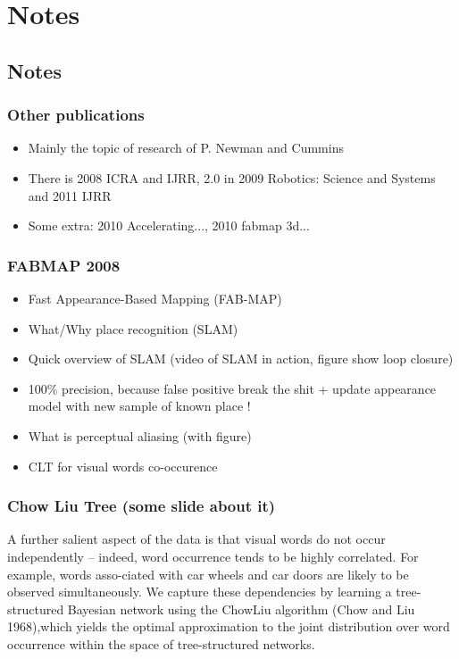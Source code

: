 \section{Notes}

\subsection{Notes}

\begin{frame}
    \frametitle{Other publications}
    \begin{itemize}
        \item Mainly the topic of research of P. Newman and Cummins
        \item There is 2008 ICRA and IJRR, 2.0 in 2009 Robotics: Science and Systems and 2011 IJRR
        \item Some extra: 2010 Accelerating..., 2010 fabmap 3d...
    \end{itemize}
\end{frame}

\begin{frame}
    \frametitle{FABMAP 2008}
    \begin{itemize}
        \item Fast Appearance-Based Mapping (FAB-MAP)
        \item What/Why place recognition (SLAM)
        \item Quick overview of SLAM (video of SLAM in action, figure show loop closure)
        \item 100\% precision, because false positive break the shit + update appearance model with new sample of known place !
        \item What is perceptual aliasing (with figure)
        \item CLT for visual words co-occurence
    \end{itemize}
\end{frame}

\begin{frame}
    \frametitle{Chow Liu Tree (some slide about it)}
    A further salient aspect of the data is that visual words do not occur independently – indeed, word occurrence tends to be highly correlated. For example, words asso-ciated with car wheels and car doors are likely to be observed simultaneously. We capture these dependencies by learning a tree-structured Bayesian network using the ChowLiu algorithm (Chow and Liu 1968),which yields the optimal approximation to the joint distribution over word occurrence within the space of tree-structured networks.
\end{frame}

